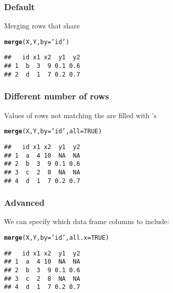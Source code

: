 \documentclass[12pt]{beamer}\usepackage[]{graphicx}\usepackage[]{color}
\makeatletter
\newcommand{\hlnum}[1]{\textcolor[rgb]{0.686,0.059,0.569}{#1}}%
\newcommand{\hlstr}[1]{\textcolor[rgb]{0.192,0.494,0.8}{#1}}%
\newcommand{\hlstd}[1]{\textcolor[rgb]{0.345,0.345,0.345}{#1}}%
\newcommand{\hlkwc}[1]{\textcolor[rgb]{0.333,0.667,0.333}{#1}}%
\newcommand{\hlkwd}[1]{\textcolor[rgb]{0.737,0.353,0.396}{\textbf{#1}}}%
\newenvironment{kframe}{%
 \def\at@end@of@kframe{}%
 \ifinner\ifhmode%
  \def\at@end@of@kframe{\end{minipage}}%
  \begin{minipage}{\columnwidth}%
 \fi\fi%
 \def\FrameCommand##1{\hskip\@totalleftmargin \hskip-\fboxsep
 \colorbox{shadecolor}{##1}\hskip-\fboxsep
     \hskip-\linewidth \hskip-\@totalleftmargin \hskip\columnwidth}%
 \MakeFramed {\advance\hsize-\width
   \@totalleftmargin\z@ \linewidth\hsize
   \@setminipage}}%
 {\par\unskip\endMakeFramed%
 \at@end@of@kframe}
\newenvironment{knitrout}{}{} %
\makeatother
\begin{document}
\begin{frame}[fragile]
\frametitle{Default }

Merging rows that share 
\begin{knitrout}\footnotesize
{}\color{fgcolor}\begin{kframe}
\begin{alltt}
\hlkwd{merge}\hlstd{(X, Y,} \hlkwc{by} \hlstd{=} \hlstr{'id'}\hlstd{)}
\end{alltt}
\begin{verbatim}
##   id x1 x2  y1  y2
## 1  b  3  9 0.1 0.6
## 2  d  1  7 0.2 0.7
\end{verbatim}
\end{kframe}
\end{knitrout}

\end{frame}


\begin{frame}[fragile]
\frametitle{Different number of rows}

Values of rows not matching the  are filled with 's
\begin{knitrout}\footnotesize
{}\color{fgcolor}\begin{kframe}
\begin{alltt}
\hlkwd{merge}\hlstd{(X, Y,} \hlkwc{by} \hlstd{=} \hlstr{'id'}\hlstd{,} \hlkwc{all} \hlstd{=} \hlnum{TRUE}\hlstd{)}
\end{alltt}
\begin{verbatim}
##   id x1 x2  y1  y2
## 1  a  4 10  NA  NA
## 2  b  3  9 0.1 0.6
## 3  c  2  8  NA  NA
## 4  d  1  7 0.2 0.7
\end{verbatim}
\end{kframe}
\end{knitrout}

\end{frame}


\begin{frame}[fragile]
\frametitle{Advanced }

We can specify which data frame columns to include:
\begin{knitrout}\footnotesize
{}\color{fgcolor}\begin{kframe}
\begin{alltt}
\hlkwd{merge}\hlstd{(X, Y,} \hlkwc{by} \hlstd{=} \hlstr{'id'}\hlstd{,} \hlkwc{all.x} \hlstd{=} \hlnum{TRUE}\hlstd{)}
\end{alltt}
\begin{verbatim}
##   id x1 x2  y1  y2
## 1  a  4 10  NA  NA
## 2  b  3  9 0.1 0.6
## 3  c  2  8  NA  NA
## 4  d  1  7 0.2 0.7
\end{verbatim}
\end{kframe}
\end{knitrout}

\end{frame}
\end{document}
